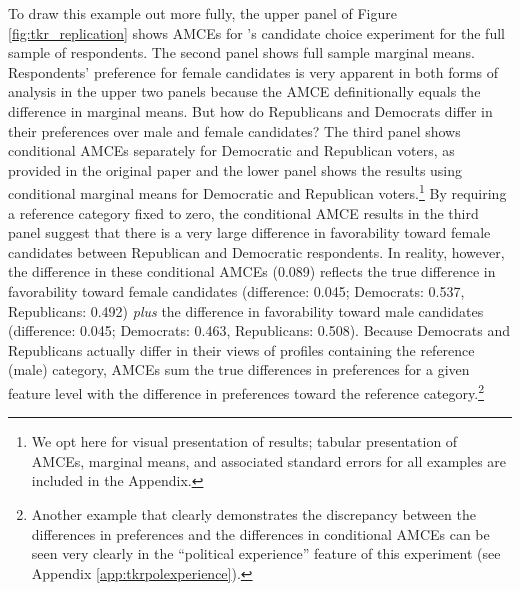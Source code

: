 \documentclass[a4paper,12pt]{article}\usepackage[]{graphicx}\usepackage[]{color}
\begin{document}
To draw this example out more fully, the upper panel of Figure \ref{fig:tkr_replication} shows AMCEs for \citeauthor{TeeleKallaRosenbluth2018}'s candidate choice experiment for the full sample of respondents. The second panel shows full sample marginal means. Respondents' preference for female candidates is very apparent in both forms of analysis in the upper two panels because the AMCE definitionally equals the difference in marginal means. But how do Republicans and Democrats differ in their preferences over male and female candidates? The third panel shows conditional AMCEs separately for Democratic and Republican voters, as provided in the original paper and the lower panel shows the results using conditional marginal means for Democratic and Republican voters.\footnote{We opt here for visual presentation of results; tabular presentation of AMCEs, marginal means, and associated standard errors for all examples are included in the Appendix.} By requiring a reference category fixed to zero, the conditional AMCE results in the third panel suggest that there is a very large difference in favorability toward female candidates between Republican and Democratic respondents. In reality, however, the difference in these conditional AMCEs (0.089) reflects the true difference in favorability toward female candidates (difference: 0.045; Democrats: 0.537, Republicans: 0.492) \textit{plus} the difference in favorability toward male candidates (difference: 0.045; Democrats: 0.463, Republicans: 0.508). Because Democrats and Republicans actually differ in their views of profiles containing the reference (male) category, AMCEs sum the true differences in preferences for a given feature level with the difference in preferences toward the reference category.\footnote{Another example that clearly demonstrates the discrepancy between the differences in preferences and the differences in conditional AMCEs can be seen very clearly in the ``political experience'' feature of this experiment (see Appendix \ref{app:tkrpolexperience}).}
\end{document}
